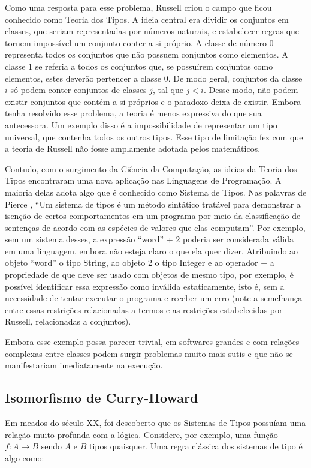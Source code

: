 \documentclass[12pt, oneside, a4paper,english,brazil]{abntex2}
\begin{document}
\qquad Como uma resposta para esse problema, Russell criou o campo que ficou conhecido
como Teoria dos Tipos. A ideia central era dividir os conjuntos em classes, que seriam
representadas por números naturais, e estabelecer regras que tornem impossível um
conjunto conter a si próprio. A classe de número $0$ representa todos os conjuntos que
não possuem conjuntos como elementos. A classe $1$ se referia a todos os conjuntos que,
se possuírem conjuntos como elementos, estes deverão pertencer a classe $0$. De modo
geral, conjuntos da classe $i$ só podem conter conjuntos de classes $j$, tal que $j < i$. Desse
modo, não podem existir conjuntos que contém a si próprios e o paradoxo deixa de existir.
Embora tenha resolvido esse problema, a teoria é menos expressiva do que sua antecessora.
Um exemplo disso \'e a impossibilidade de representar um tipo universal, que
contenha todos os outros tipos. Esse tipo de limita\c{c}\~ao fez com que a
teoria de Russell não fosse amplamente adotada pelos matemáticos.

\qquad Contudo, com o surgimento da Ciência da Computação, as ideias da Teoria dos Tipos
encontraram uma nova aplicação nas Linguagens de Programação. A maioria delas adota
algo que é conhecido como Sistema de Tipos. Nas palavras de Pierce \cite{pierce}, ``Um sistema de
tipos é um método sintático tratável para demonstrar a isenção de certos comportamentos
em um programa por meio da classificação de senten\c{c}as de acordo com as espécies de valores
que elas computam''. Por exemplo, sem um sistema desses, a expressão \textsf{``word'' + 2} poderia
ser considerada válida em uma linguagem, embora não esteja claro o que ela quer dizer.
Atribuindo ao objeto \textsf{``word''} o tipo String, ao objeto \textsf{2} o tipo Integer e ao operador
\textsf{+} a propriedade de que deve ser usado com objetos de mesmo tipo, por exemplo, é
possível identificar essa expressão como inválida estaticamente, isto \'e, sem a necessidade de tentar executar o programa e receber um erro (note a
semelhança entre essas restrições relacionadas a termos e as restrições estabelecidas por
Russell, relacionadas a conjuntos).

\qquad Embora esse exemplo possa parecer trivial, em softwares grandes e com relações
complexas entre classes podem surgir problemas muito mais sutis e que não se manifestariam
imediatamente na execução.

\subsection*{Isomorfismo de Curry-Howard}
\qquad Em meados do século XX, foi descoberto que os Sistemas de Tipos possuíam uma
relação muito profunda com a lógica. Considere, por exemplo, uma função $f : A \rightarrow B$
sendo $A$ e $B$ tipos quaisquer. Uma regra clássica dos sistemas de tipo é algo como:
\end{document}
